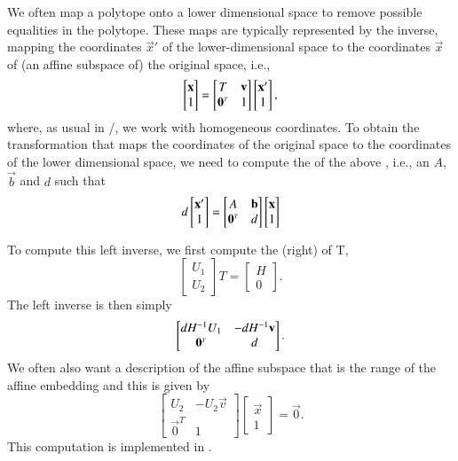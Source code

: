 We often map a polytope onto a lower dimensional space to remove possible
equalities in the polytope.  These maps are typically represented
by the inverse, mapping the coordinates $\vec x'$ of the lower-dimensional
space to the coordinates $\vec x$ of (an affine subspace of) the original space,
i.e.,
$$
\begin{bmatrix}
\vec x \\ 1
\end{bmatrix}
=
\begin{bmatrix}
T & \vec v \\ \vec 0^\T & 1
\end{bmatrix}
\begin{bmatrix}
\vec x' \\ 1
\end{bmatrix}
,
$$
where, as usual in \PolyLib/, we work with homogeneous coordinates.
To obtain the transformation that maps the coordinates of the original
space to the coordinates of the lower dimensional space,
we need to compute the  of the above ,
i.e., an $A$, $\vec b$ and $d$ such that
$$
d
\begin{bmatrix}
\vec x' \\ 1
\end{bmatrix}
=
\begin{bmatrix}
A & \vec b \\ \vec 0^\T & d
\end{bmatrix}
\begin{bmatrix}
\vec x \\ 1
\end{bmatrix}
$$

To compute this left inverse, we first compute the
(right)  of T,
$$
\begin{bmatrix}
U_1 \\ U_2
\end{bmatrix}
T
=
\begin{bmatrix}
H \\ 0
\end{bmatrix}
.
$$
The left inverse is then simply
$$
\begin{bmatrix}
d H^{-1}U_1 & -d H^{-1} \vec v \\ \vec 0^\T & d
\end{bmatrix}
.
$$
We often also want a description of the affine subspace that is the range
of the affine embedding and this is given by
$$
\begin{bmatrix}
U_2 & - U_2 \vec v \\ \vec 0^T & 1
\end{bmatrix}
\begin{bmatrix}
\vec x \\ 1
\end{bmatrix}
=
\vec 0
.
$$
This computation is implemented in .

